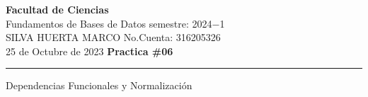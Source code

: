 \documentclass[a4paper,12pt]{article}
\begin{document}
\pagecolor{black}
\color{white}

\thispagestyle{firstpage} %
\noindent
\large\textbf{Facultad de Ciencias} \\
Fundamentos de Bases de Datos \hfill semestre: 2024$-$1 \\
\textsc{SILVA HUERTA MARCO}   \hfill No.Cuenta: 316205326    \\
25 de Octubre de 2023      \hfill \textbf{Practica \#06}    \\
\noindent\rule{7.3in}{2.8pt}

\begin{center}
\textcolor{sun}{\Large{Dependencias Funcionales y Normalización}}
\end{center}








\end{document}
